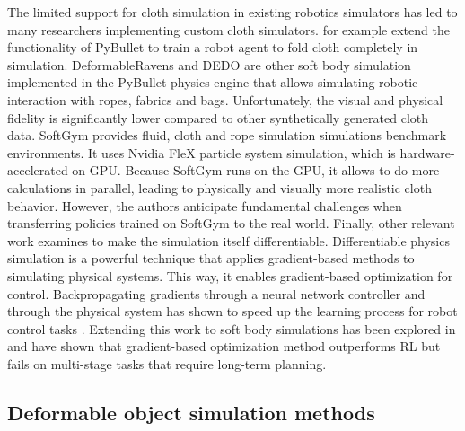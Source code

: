 \documentclass[\home/main.tex]{subfiles}
\begin{document}
The limited support for cloth simulation in existing robotics simulators has led to many researchers implementing custom cloth simulators. \textcite{Matas2018} for example extend the functionality of PyBullet to train a robot agent to fold cloth completely in simulation. DeformableRavens \autocite{seita2021learning} and DEDO \autocite{dedo} are other soft body simulation implemented in the PyBullet physics engine that allows simulating robotic interaction with ropes, fabrics and bags. Unfortunately, the visual and physical fidelity is significantly lower compared to other synthetically generated cloth data. SoftGym \autocite{softgym} provides fluid, cloth and rope simulation simulations benchmark environments. It uses Nvidia FleX particle system simulation, which is hardware-accelerated on \gls{GPU}. Because SoftGym runs on the \gls{GPU}, it allows to do more calculations in parallel, leading to physically and visually more realistic cloth behavior. However, the authors anticipate fundamental challenges when transferring policies trained on SoftGym to the real world. Finally, other relevant work examines to make the simulation itself differentiable. Differentiable physics simulation is a powerful technique that applies gradient-based methods to simulating physical systems. This way, it enables gradient-based optimization for control.
Backpropagating gradients through a neural network controller and through the physical system has shown to speed up the learning process for robot control tasks \autocite{Degrave2019}. Extending this work to soft body simulations has been explored in \autocite{liang2019differentiable,huang2021plasticinelab} and have shown that gradient-based optimization method outperforms RL but fails on multi-stage tasks that require long-term planning.

\subsection{Deformable object simulation methods} \label{subsec:lit_cloth_sim}
\end{document}
